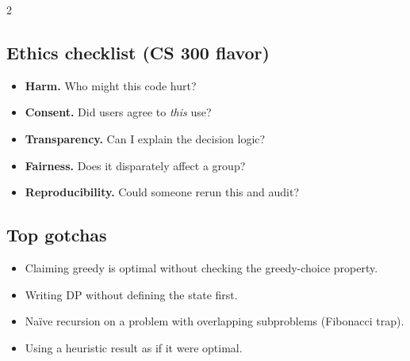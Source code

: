 \documentclass[10pt]{article}
\begin{document}
\begin{multicols}{2}
\subsection*{Ethics checklist (CS 300 flavor)}
\begin{itemize}
    \item \textbf{Harm.} Who might this code hurt?
    \item \textbf{Consent.} Did users agree to \emph{this} use?
    \item \textbf{Transparency.} Can I explain the decision logic?
    \item \textbf{Fairness.} Does it disparately affect a group?
    \item \textbf{Reproducibility.} Could someone rerun this and audit?
\end{itemize}

\subsection*{Top gotchas}
\begin{itemize}
    \item Claiming greedy is optimal without checking the
    greedy-choice property.
    \item Writing DP without defining the state first.
    \item Na\"ive recursion on a problem with overlapping subproblems
    (Fibonacci trap).
    \item Using a heuristic result as if it were optimal.
\end{itemize}

\end{multicols}
\end{document}
